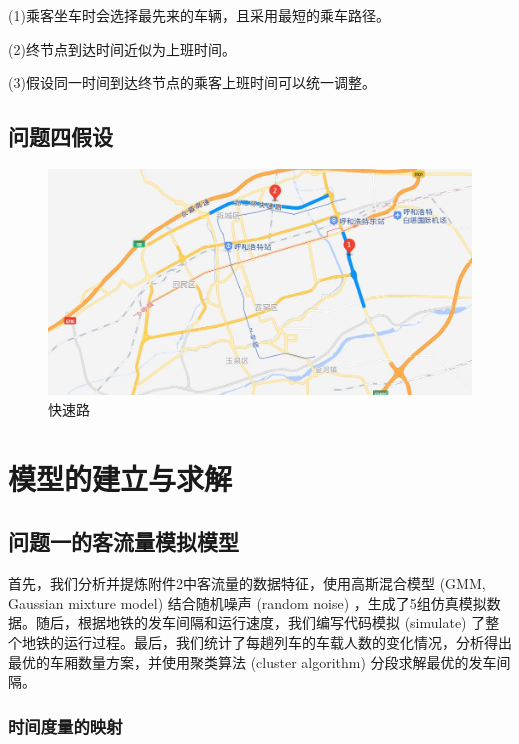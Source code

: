 \documentclass[12pt,a4paper]{mcmthesis}
\begin{document}
    (1)乘客坐车时会选择最先来的车辆，且采用最短的乘车路径。

    (2)终节点到达时间近似为上班时间。

    (3)假设同一时间到达终节点的乘客上班时间可以统一调整。

    \subsection{问题四假设}

    \begin{figure}[h]
        \centering
        \includegraphics[scale=0.6]{figures/fast-road}
        \caption{\song\wuhao 快速路}
        \label{fig:p4_fast-road}
    \end{figure}


    \section{模型的建立与求解}

    \subsection{问题一的客流量模拟模型}

    首先，我们分析并提炼附件2中客流量的数据特征，使用高斯混合模型 (GMM, Gaussian mixture model) 结合随机噪声 (random noise) ，生成了5组仿真模拟数据。随后，根据地铁的发车间隔和运行速度，我们编写代码模拟 (simulate) 了整个地铁的运行过程。最后，我们统计了每趟列车的车载人数的变化情况，分析得出最优的车厢数量方案，并使用聚类算法 (cluster algorithm) 分段求解最优的发车间隔。

    \subsubsection{时间度量的映射}
\end{document}
